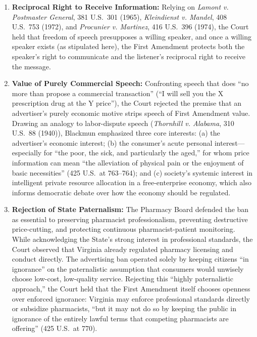 \documentclass[12pt]{article}
\begin{document}
\begin{enumerate}
  \item \textbf{Reciprocal Right to Receive Information:} Relying on \textit{Lamont v. Postmaster General}, 381 U.S.\ 301 (1965), \textit{Kleindienst v. Mandel}, 408 U.S.\ 753 (1972), and \textit{Procunier v. Martinez}, 416 U.S.\ 396 (1974), the Court held that freedom of speech presupposes a willing speaker, and once a willing speaker exists (as stipulated here), the First Amendment protects both the speaker's right to communicate and the listener's reciprocal right to receive the message.

  \item \textbf{Value of Purely Commercial Speech:} Confronting speech that does ``no more than propose a commercial transaction'' (``I will sell you the X prescription drug at the Y price''), the Court rejected the premise that an advertiser's purely economic motive strips speech of First Amendment value. Drawing an analogy to labor-dispute speech (\textit{Thornhill v. Alabama}, 310 U.S.\ 88 (1940)), Blackmun emphasized three core interests: (a) the advertiser's economic interest; (b) the consumer's acute personal interest---especially for ``the poor, the sick, and particularly the aged,'' for whom price information can mean ``the alleviation of physical pain or the enjoyment of basic necessities'' (425 U.S.\ at 763--764); and (c) society's systemic interest in intelligent private resource allocation in a free-enterprise economy, which also informs democratic debate over how the economy should be regulated.

  \item \textbf{Rejection of State Paternalism:} The Pharmacy Board defended the ban as essential to preserving pharmacist professionalism, preventing destructive price-cutting, and protecting continuous pharmacist-patient monitoring. While acknowledging the State's strong interest in professional standards, the Court observed that Virginia already regulated pharmacy licensing and conduct directly. The advertising ban operated solely by keeping citizens ``in ignorance'' on the paternalistic assumption that consumers would unwisely choose low-cost, low-quality service. Rejecting this ``highly paternalistic approach,'' the Court held that the First Amendment itself chooses openness over enforced ignorance: Virginia may enforce professional standards directly or subsidize pharmacists, ``but it may not do so by keeping the public in ignorance of the entirely lawful terms that competing pharmacists are offering'' (425 U.S.\ at 770).


\end{enumerate}
\end{document}
